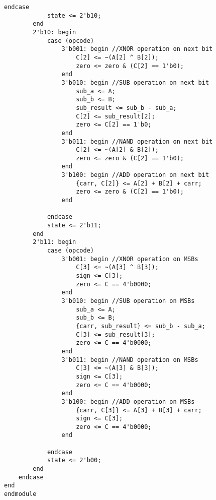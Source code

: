 \begin{lstlisting}[style=verilogStyle, caption={Verilog code for 4-bit ALU},label={lst: Verilog HDL Code for 4-bit ALU}]
            endcase
            state <= 2'b10;
        end
        2'b10: begin
            case (opcode)
                3'b001: begin //XNOR operation on next bit
                    C[2] <= ~(A[2] ^ B[2]);
                    zero <= zero & (C[2] == 1'b0);
                end
                3'b010: begin //SUB operation on next bit
					sub_a <= A;
					sub_b <= B;
                    sub_result <= sub_b - sub_a;
                    C[2] <= sub_result[2];
                    zero <= C[2] == 1'b0;
                end
                3'b011: begin //NAND operation on next bit
                    C[2] <= ~(A[2] & B[2]);
                    zero <= zero & (C[2] == 1'b0);
                end
                3'b100: begin //ADD operation on next bit
                    {carr, C[2]} <= A[2] + B[2] + carr;
                    zero <= zero & (C[2] == 1'b0);
                end

            endcase
            state <= 2'b11;
        end
        2'b11: begin
            case (opcode)
                3'b001: begin //XNOR operation on MSBs
                    C[3] <= ~(A[3] ^ B[3]);
                    sign <= C[3];
                    zero <= C == 4'b0000;
                end
                3'b010: begin //SUB operation on MSBs
					sub_a <= A;
					sub_b <= B;
                    {carr, sub_result} <= sub_b - sub_a;
                    C[3] <= sub_result[3];
                    zero <= C == 4'b0000;
                end
                3'b011: begin //NAND operation on MSBs
                    C[3] <= ~(A[3] & B[3]);
                    sign <= C[3];
                    zero <= C == 4'b0000;
                end
                3'b100: begin //ADD operation on MSBs
                    {carr, C[3]} <= A[3] + B[3] + carr;
                    sign <= C[3];
                    zero <= C == 4'b0000;
                end

            endcase
            state <= 2'b00;
        end
    endcase
end
endmodule
\end{lstlisting}
